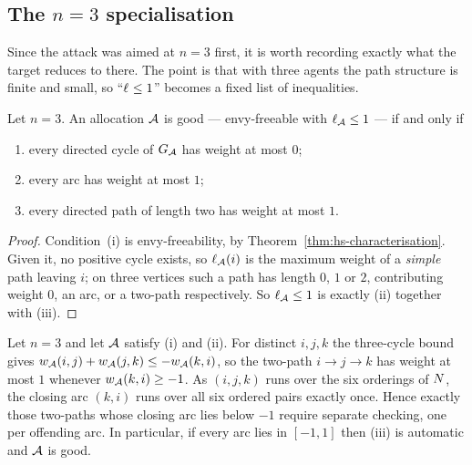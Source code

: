 \subsection{The $n = 3$ specialisation}
\label{sec:n3}

Since the attack was aimed at $n = 3$ first, it is worth recording exactly what
the target reduces to there. The point is that with three agents the path
structure is finite and small, so ``$\ell_{} \le 1$'' becomes a fixed list of
inequalities.

\begin{proposition}[Characterisation at $n = 3$]
\label{prop:n3}
Let $n = 3$. An allocation $\mathcal{A}$ is good --- envy-freeable with
$\ell_{\mathcal{A}} \le 1$ --- if and only if
\begin{enumerate}
  \item[(i)] every directed cycle of $G_{\mathcal{A}}$ has weight at most
    $0$;
  \item[(ii)] every arc has weight at most $1$;
  \item[(iii)] every directed path of length two has weight at most $1$.
\end{enumerate}
\end{proposition}

\begin{proof}
Condition~(i) is envy-freeability, by Theorem~\ref{thm:hs-characterisation}.
Given it, no positive cycle exists, so $\ell_{\mathcal{A}}(i)$ is the maximum weight
of a \emph{simple} path leaving $i$; on three vertices such a path has length
$0$, $1$ or $2$, contributing weight $0$, an arc, or a two-path respectively.
So $\ell_{\mathcal{A}} \le 1$ is exactly (ii) together with (iii).
\end{proof}

\begin{corollary}
\label{cor:n3-six}
Let $n = 3$ and let $\mathcal{A}$ satisfy (i) and (ii). For distinct $i,j,k$ the
three-cycle bound gives
$w_{\mathcal{A}}(i,j) + w_{\mathcal{A}}(j,k) \le -w_{\mathcal{A}}(k,i)$, so the
two-path $i \to j \to k$ has weight at most $1$ whenever
$w_{\mathcal{A}}(k,i) \ge -1$. As $(i,j,k)$ runs over the six orderings of
$N$, the closing arc $(k,i)$ runs over all six ordered pairs exactly once.
Hence exactly those two-paths whose closing arc lies below $-1$ require separate
checking, one per offending arc. In particular, if every arc lies in $[-1,1]$
then (iii) is automatic and $\mathcal{A}$ is good.
\end{corollary}

